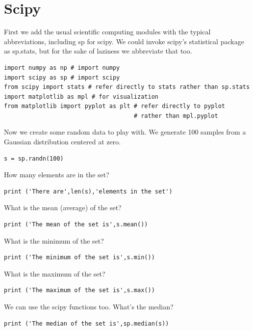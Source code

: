 \chapter{Scipy}\label{c:scipy-example}

First we add the usual scientific computing modules with the typical
abbreviations, including sp for scipy. We could invoke scipy's
statistical package as sp.stats, but for the sake of laziness we
abbreviate that too.

\begin{verbatim}
import numpy as np # import numpy
import scipy as sp # import scipy
from scipy import stats # refer directly to stats rather than sp.stats
import matplotlib as mpl # for visualization
from matplotlib import pyplot as plt # refer directly to pyplot 
                                     # rather than mpl.pyplot
\end{verbatim}

Now we create some random data to play with. We generate 100 samples
from a Gaussian distribution centered at zero.

\begin{verbatim}
s = sp.randn(100)
\end{verbatim}

How many elements are in the set?

\begin{verbatim}
print ('There are',len(s),'elements in the set')
\end{verbatim}

What is the mean (average) of the set?

\begin{verbatim}
print ('The mean of the set is',s.mean())
\end{verbatim}

What is the minimum of the set?

\begin{verbatim}
print ('The minimum of the set is',s.min())
\end{verbatim}

What is the maximum of the set?

\begin{verbatim}
print ('The maximum of the set is',s.max())
\end{verbatim}

We can use the scipy functions too. What's the median?

\begin{verbatim}
print ('The median of the set is',sp.median(s))
\end{verbatim}

